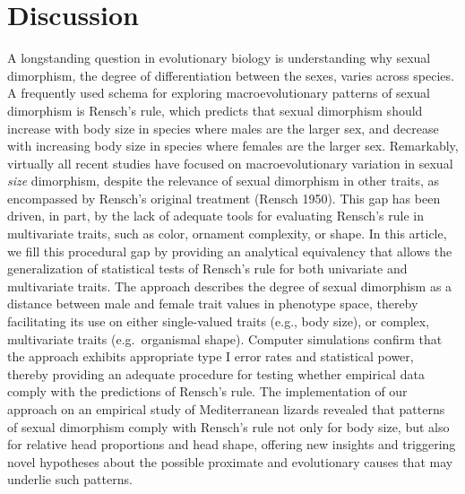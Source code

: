 \documentclass[]{article}
\begin{document}
\section{Discussion}\label{discussion}

A longstanding question in evolutionary biology is understanding why
sexual dimorphism, the degree of differentiation between the sexes,
varies across species. A frequently used schema for exploring
macroevolutionary patterns of sexual dimorphism is Rensch's rule, which
predicts that sexual dimorphism should increase with body size in
species where males are the larger sex, and decrease with increasing
body size in species where females are the larger sex. Remarkably,
virtually all recent studies have focused on macroevolutionary variation
in sexual \emph{size} dimorphism, despite the relevance of sexual
dimorphism in other traits, as encompassed by Rensch's original
treatment (Rensch 1950). This gap has been driven, in part, by the lack
of adequate tools for evaluating Rensch's rule in multivariate traits,
such as color, ornament complexity, or shape. In this article, we fill
this procedural gap by providing an analytical equivalency that allows
the generalization of statistical tests of Rensch's rule for both
univariate and multivariate traits. The approach describes the degree of
sexual dimorphism as a distance between male and female trait values in
phenotype space, thereby facilitating its use on either single-valued
traits (e.g., body size), or complex, multivariate traits
(e.g.~organismal shape). Computer simulations confirm that the approach
exhibits appropriate type I error rates and statistical power, thereby
providing an adequate procedure for testing whether empirical data
comply with the predictions of Rensch's rule. The implementation of our
approach on an empirical study of Mediterranean lizards revealed that
patterns of sexual dimorphism comply with Rensch's rule not only for
body size, but also for relative head proportions and head shape,
offering new insights and triggering novel hypotheses about the possible
proximate and evolutionary causes that may underlie such patterns.
\hfill\break
\end{document}
